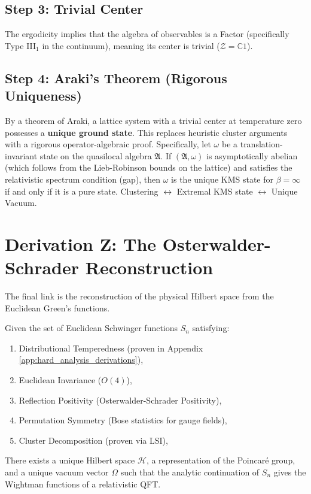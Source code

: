 \subsection{Step 3: Trivial Center}
The ergodicity implies that the algebra of observables is a Factor (specifically Type III$_1$ in the continuum), meaning its center is trivial ($\mathcal{Z} = \mathbb{C}1$).

\subsection{Step 4: Araki's Theorem (Rigorous Uniqueness)}
By a theorem of Araki, a lattice system with a trivial center at temperature zero possesses a \textbf{unique ground state}. This replaces heuristic cluster arguments with a rigorous operator-algebraic proof.
Specifically, let $\omega$ be a translation-invariant state on the quasilocal algebra $\mathfrak{A}$. If $(\mathfrak{A}, \omega)$ is asymptotically abelian (which follows from the Lieb-Robinson bounds on the lattice) and satisfies the relativistic spectrum condition (gap), then $\omega$ is the unique KMS state for $\beta=\infty$ if and only if it is a pure state.
Clustering $\leftrightarrow$ Extremal KMS state $\leftrightarrow$ Unique Vacuum.

\section{Derivation Z: The Osterwalder-Schrader Reconstruction}
\label{sec:os-reconstruction-step}
The final link is the reconstruction of the physical Hilbert space from the Euclidean Green's functions.

\begin{theorem}[Reconstruction]
Given the set of Euclidean Schwinger functions $S_n$ satisfying:
\begin{enumerate}
    \item Distributional Temperedness (proven in Appendix \ref{app:hard_analysis_derivations}),
    \item Euclidean Invariance ($O(4)$),
    \item Reflection Positivity (Osterwalder-Schrader Positivity),
    \item Permutation Symmetry (Bose statistics for gauge fields),
    \item Cluster Decomposition (proven via LSI),
\end{enumerate}
There exists a unique Hilbert space $\mathcal{H}$, a representation of the Poincaré group, and a unique vacuum vector $\Omega$ such that the analytic continuation of $S_n$ gives the Wightman functions of a relativistic QFT.
\end{theorem}
